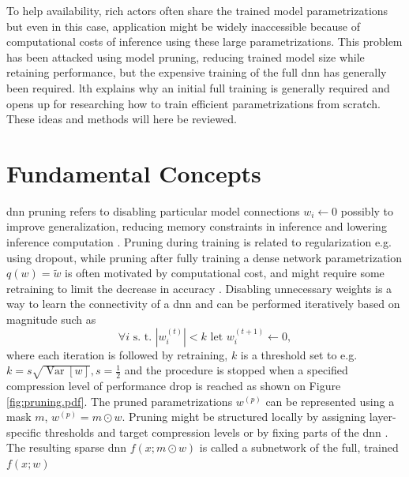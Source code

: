 \documentclass[12pt,fleqn,twocolumn]{article}
\newcommand{\half}{\ensuremath{\frac{1}{2}}}
\begin{document}
To help availability, rich actors often share the trained model parametrizations but even in this case, application might be widely inaccessible because of computational costs of inference using these large parametrizations.
This problem has been attacked using model pruning, reducing trained model size while retaining performance, but the expensive training of the full \acrshort{dnn} has generally been required.
\acrshort{lth} explains why an initial full training is generally required and opens up for researching how to train efficient parametrizations from scratch.
These ideas and methods will here be reviewed.

\section*{Fundamental Concepts}%
\acrshort{dnn} pruning refers to disabling particular model connections $w_i \leftarrow 0$ possibly to improve generalization, reducing memory constraints in inference and lowering inference computation \cite{LeCun1989OptimalBD}.
Pruning during training is related to regularization e.g. using dropout, while pruning after fully training a dense network parametrization $q(w)=\tilde w$ is often motivated by computational cost, and might require some retraining to limit the decrease in accuracy \cite{lange2020lth}.
Disabling unnecessary weights is a way to learn the connectivity of a \acrshort{dnn} and can be performed iteratively based on magnitude such as 
\begin{equation}
    \forall i \text{ s. t. } |w_i^{(t)}|<k \text{ let } w_i^{(t+1)} \leftarrow 0,
\end{equation}
where each iteration is followed by retraining, $k$ is a threshold set to e.g. $k=s\sqrt{\operatorname{Var}[w]}, s=\half$ \cite{han2015learning, nzmora2019distiller} and the procedure is stopped when a specified compression level of performance drop is reached \cite{han2015learning} as shown on Figure \ref{fig:pruning.pdf}.
The pruned parametrizations $w^{(p)}$ can be represented using a mask $m$, $w^{(p)} = m \odot w$.
Pruning might be structured locally by assigning layer-specific thresholds and target compression levels or by fixing parts of the \acrshort{dnn} \cite{han2015learning}.
The resulting sparse \acrshort{dnn} $f(x;m\odot w)$ is called a subnetwork of the full, trained $f(x;w)$
\end{document}
